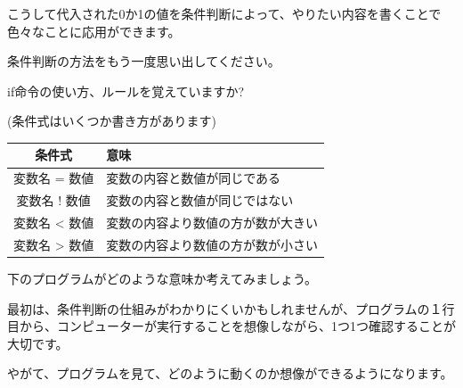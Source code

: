 こうして代入された0か1の値を条件判断によって、やりたい内容を書くことで色々なことに応用ができます。


条件判断の方法をもう一度思い出してください。

if命令の使い方、ルールを覚えていますか?

\begin{description}
    \item {}
    \item {}
    \item {}
    \item {}
\end{description}

\begin{center}
    (条件式はいくつか書き方があります)
\end{center}
\begin{center}
    \begin{tabular}{cl} \hline
        条件式 & 意味 \\ \hline
        変数名 = 数値 & 変数の内容と数値が同じである \\
        変数名 ! 数値 & 変数の内容と数値が同じではない \\
        変数名 {\textless} 数値 & 変数の内容より数値の方が数が大きい \\
        変数名 {\textgreater} 数値 & 変数の内容より数値の方が数が小さい \\ \hline
    \end{tabular}
\end{center}

下のプログラムがどのような意味か考えてみましょう。


\begin{description}
    \item {}
    \item {}
\end{description}

最初は、条件判断の仕組みがわかりにくいかもしれませんが、プログラムの１行目から、コンピューターが実行することを想像しながら、1つ1つ確認することが大切です。

やがて、プログラムを見て、どのように動くのか想像ができるようになります。

